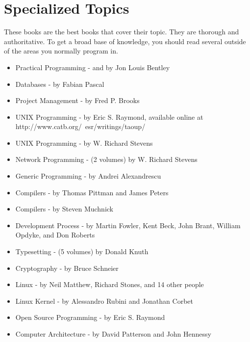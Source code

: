 \section{Specialized Topics}

These books are the best books that cover their topic.  They are thorough and
authoritative.  To get a broad base of knowledge, you should read several
outside of the areas you normally program in.

\begin{itemize}\item Practical Programming -  and  by Jon Louis Bentley 
\item Databases -  by Fabian Pascal 
\item Project Management -  by Fred P. Brooks 
\item UNIX Programming -  by Eric S. Raymond, available online at http://www.catb.org/~esr/writings/taoup/ 
\item UNIX Programming -  by W. Richard Stevens 
\item Network Programming -  (2 volumes) by W. Richard Stevens 
\item Generic Programming -  by Andrei Alexandrescu 
\item Compilers -  by Thomas Pittman and James Peters 
\item Compilers -  by Steven Muchnick 
\item Development Process -  by Martin Fowler, Kent Beck, John Brant, William Opdyke, and Don Roberts 
\item Typesetting -  (5 volumes) by Donald Knuth 
\item Cryptography -  by Bruce Schneier 
\item Linux -  by Neil Matthew, Richard Stones, and 14 other people 
\item Linux Kernel -  by Alessandro Rubini and Jonathan Corbet 
\item Open Source Programming -  by Eric S. Raymond 
\item Computer Architecture -  by David Patterson and John Hennessy 
\end{itemize}

